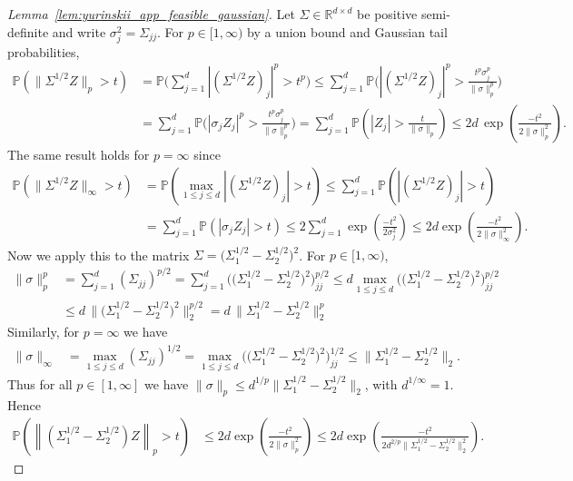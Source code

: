 \documentclass[11pt,lof]{puthesis}
\renewcommand{\P}{\ensuremath{\mathbb{P}}}
\newcommand{\R}{\ensuremath{\mathbb{R}}}
\theoremstyle{break}
\theoremstyle{proof}
\newtheorem{proof}{Proof}
\begin{document}
\begin{proof}[Lemma~\ref{lem:yurinskii_app_feasible_gaussian}]

Let $\Sigma \in \R^{d \times d}$ be positive semi-definite
and write $\sigma^2_j = \Sigma_{j j} $.
For $p \in [1, \infty)$ by a union bound and
Gaussian tail probabilities,
%
\begin{align*}
\P\left(\big\| \Sigma^{1/2} Z \big\|_p > t \right)
&=
\P\Bigg(
\sum_{j=1}^d
\left|
\left(
\Sigma^{1/2} Z
\right)_j
\right|^p
> t^p \Bigg)
\leq
\sum_{j=1}^d
\P\Bigg(
\left|
\left(
\Sigma^{1/2} Z
\right)_j
\right|^p
> \frac{t^p \sigma_j^p}{\|\sigma\|_p^p}
\Bigg) \\
&=
\sum_{j=1}^d
\P\Bigg(
\left|
\sigma_j Z_j
\right|^p
> \frac{t^p \sigma_j^p}{\|\sigma\|_p^p}
\Bigg)
=
\sum_{j=1}^d
\P\left(
\left| Z_j \right|
> \frac{t}{\|\sigma\|_p}
\right)
\leq
2 d \, \exp\left( \frac{-t^2}{2 \|\sigma\|_p^2} \right).
\end{align*}
%
The same result holds for $p = \infty$ since
%
\begin{align*}
\P\left(\big\| \Sigma^{1/2} Z \big\|_\infty > t \right)
&=
\P\left(
\max_{1 \leq j \leq d}
\left|
\left(
\Sigma^{1/2} Z
\right)_j
\right|
> t \right)
\leq
\sum_{j=1}^d
\P\left(
\left|
\left(
\Sigma^{1/2} Z
\right)_j
\right|
> t
\right) \\
&=
\sum_{j=1}^d
\P\left(
\left|
\sigma_j Z_j
\right|
> t
\right)
\leq
2 \sum_{j=1}^d
\exp\left( \frac{-t^2}{2 \sigma_j^2} \right)
\leq
2 d
\exp\left( \frac{-t^2}{2 \|\sigma\|_\infty^2} \right).
\end{align*}
%
Now we apply this to the matrix
$\Sigma = \big(\Sigma_1^{1/2} - \Sigma_2^{1/2}\big)^2$.
For $p \in [1, \infty)$,
%
\begin{align*}
\|\sigma\|_p^p
&=
\sum_{j=1}^d (\Sigma_{j j})^{p/2}
=
\sum_{j=1}^d
\Big(\big(\Sigma_1^{1/2} - \Sigma_2^{1/2}\big)^2\Big)_{j j}^{p/2}
\leq
d \max_{1 \leq j \leq d}
\Big(\big(\Sigma_1^{1/2} - \Sigma_2^{1/2}\big)^2\Big)_{j j}^{p/2} \\
&\leq
d \, \Big\|\big(\Sigma_1^{1/2} - \Sigma_2^{1/2}\big)^2\Big\|_2^{p/2}
=
d \, \big\|\Sigma_1^{1/2} - \Sigma_2^{1/2}\big\|_2^p
\end{align*}
%
Similarly, for $p = \infty$ we have
%
\begin{align*}
\|\sigma\|_\infty
&=
\max_{1 \leq j \leq d}
(\Sigma_{j j})^{1/2}
=
\max_{1 \leq j \leq d}
\Big(\big(\Sigma_1^{1/2} - \Sigma_2^{1/2}\big)^2\Big)_{j j}^{1/2}
\leq
\big\|\Sigma_1^{1/2} - \Sigma_2^{1/2}\big\|_2.
\end{align*}
%
Thus for all $p \in [1, \infty]$ we have
$\|\sigma\|_p \leq
d^{1/p} \big\|\Sigma_1^{1/2} - \Sigma_2^{1/2}\big\|_2$,
with $d^{1/\infty} = 1$. Hence
%
\begin{align*}
\P\left(
\left\|
\left(\Sigma_1^{1/2} - \Sigma_2^{1/2}\right) Z
\right\|_p
> t
\right)
&\leq
2 d \exp \left( \frac{-t^2}{2 \|\sigma\|_p^2} \right)
\leq
2 d \exp \left(
\frac{-t^2}
{2 d^{2/p} \big\|\Sigma_1^{1/2} - \Sigma_2^{1/2}\big\|_2^2}
\right).
\end{align*}
%
\end{proof}
\end{document}
